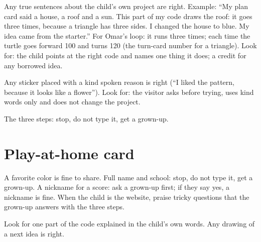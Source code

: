 \begin{answer}
Any true sentences about the child's own project are right. Example: \enquote{My plan card said a house, a roof and a sun. This part of my code draws the roof: it goes three times, because a triangle has three sides. I changed the house to blue. My idea came from the starter.} For Omar's loop: it runs three times; each time the turtle goes forward 100 and turns 120 (the turn-card number for a triangle). Look for: the child points at the right code and names one thing it does; a credit for any borrowed idea.
\end{answer}

\begin{answer}
Any sticker placed with a kind spoken reason is right (\enquote{I liked the pattern, because it looks like a flower}). Look for: the visitor asks before trying, uses kind words only and does not change the project.
\end{answer}

\begin{answer}
The three steps: stop, do not type it, get a grown-up.
\end{answer}

\section{Play-at-home card}
\begin{answer}
A favorite color is fine to share. Full name and school: stop, do not type it, get a grown-up. A nickname for a score: ask a grown-up first; if they say yes, a nickname is fine. When the child is the website, praise tricky questions that the grown-up answers with the three steps.
\end{answer}

\begin{answer}
Look for one part of the code explained in the child's own words. Any drawing of a next idea is right.
\end{answer}
